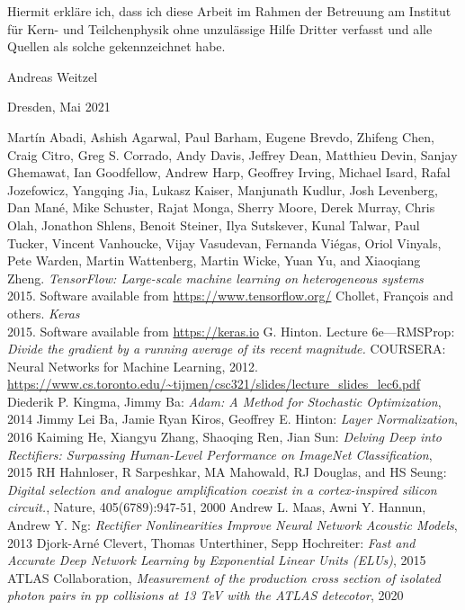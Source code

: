 \clearpage
\thispagestyle{empty}
\vspace*{1.5em}

Hiermit erkläre ich, dass ich diese Arbeit im Rahmen der Betreuung am Institut
für Kern- und Teilchenphysik ohne unzulässige Hilfe Dritter verfasst und alle Quellen als solche gekennzeichnet habe.

\vspace*{45em}

Andreas Weitzel \par
Dresden, Mai 2021



\begin{thebibliography}{9}
	 Martín Abadi, Ashish Agarwal, Paul Barham, Eugene Brevdo,
	Zhifeng Chen, Craig Citro, Greg S. Corrado, Andy Davis,
	Jeffrey Dean, Matthieu Devin, Sanjay Ghemawat, Ian Goodfellow,
	Andrew Harp, Geoffrey Irving, Michael Isard, Rafal Jozefowicz, Yangqing Jia,
	Lukasz Kaiser, Manjunath Kudlur, Josh Levenberg, Dan Mané, Mike Schuster,
	Rajat Monga, Sherry Moore, Derek Murray, Chris Olah, Jonathon Shlens,
	Benoit Steiner, Ilya Sutskever, Kunal Talwar, Paul Tucker,
	Vincent Vanhoucke, Vijay Vasudevan, Fernanda Viégas,
	Oriol Vinyals, Pete Warden, Martin Wattenberg, Martin Wicke,
	Yuan Yu, and Xiaoqiang Zheng. \textit{TensorFlow: Large-scale machine learning on heterogeneous systems}\\ 
	2015. Software available from \url{https://www.tensorflow.org/}
	 Chollet, Fran\c{c}ois and others. \textit{Keras}\\
	2015. Software available from \url{https://keras.io}
	G. Hinton. Lecture 6e—RMSProp: \textit{Divide the gradient by a running average of its recent} 
	\textit{magnitude.} COURSERA: Neural Networks for Machine Learning, 2012.
	\url{https://www.cs.toronto.edu/~tijmen/csc321/slides/lecture_slides_lec6.pdf}
	 Diederik P. Kingma, Jimmy Ba: \textit{Adam: A Method for Stochastic Optimization}, 2014
	 Jimmy Lei Ba, Jamie Ryan Kiros, Geoffrey E. Hinton: \textit{Layer Normalization}, 2016
	 Kaiming He, Xiangyu Zhang, Shaoqing Ren, Jian Sun: \textit{Delving Deep into Rectifiers: Surpassing Human-Level Performance on ImageNet Classification}, 2015
	 RH Hahnloser, R Sarpeshkar, MA Mahowald, RJ Douglas, and HS Seung: \textit{Digital selection and analogue amplification coexist in a cortex-inspired silicon circuit.}, Nature, 405(6789):947-51, 2000
	 Andrew L. Maas, Awni Y. Hannun, Andrew Y. Ng: \textit{Rectifier Nonlinearities Improve Neural Network Acoustic Models}, 2013
	 Djork-Arné Clevert, Thomas Unterthiner, Sepp Hochreiter: \textit{Fast and Accurate Deep Network Learning by Exponential Linear Units (ELUs)}, 2015
	 ATLAS Collaboration, \textit{Measurement of the production cross section of isolated photon pairs in pp collisions at 13 TeV with the ATLAS detecotor}, 2020
	
\end{thebibliography}
